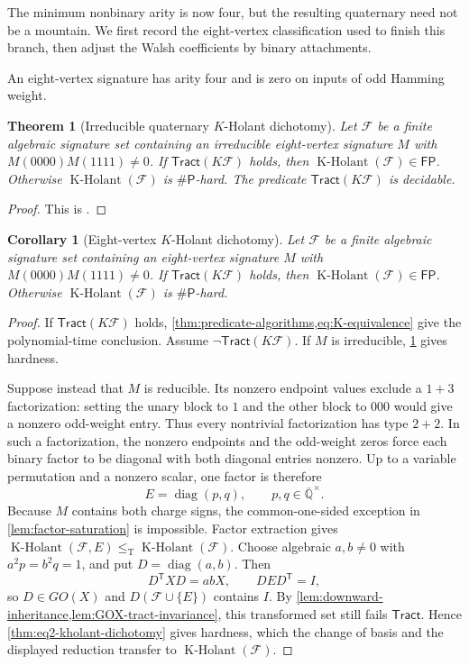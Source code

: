 \documentclass[11pt,letterpaper,onecolumn]{article}
\theoremstyle{plain}
\newtheorem{theorem}{Theorem}[section]
\newtheorem{corollary}[corollary]{Corollary}
\theoremstyle{definition}
\theoremstyle{remark}
\newcommand{\AlgNums}{\overline{\mathbb Q}}
\newcommand{\cF}{\mathcal F}
\newcommand{\KHolant}{\operatorname{K\text{-}Holant}}
\newcommand{\Tract}{\mathsf{Tract}}
\newcommand{\FP}{\mathsf{FP}}
\newcommand{\SharpP}{\#\mathsf P}
\newcommand{\diag}{\operatorname{diag}}
\newcommand{\leT}{\leq_{\mathrm T}}
\begin{document}
    The minimum nonbinary arity is now four, but the resulting quaternary
    need not be a mountain. We first record the eight-vertex classification
    used to finish this branch, then adjust the Walsh coefficients by binary
    attachments.
	
	An eight-vertex signature has arity four and is zero on inputs of odd Hamming weight.
	
	\begin{theorem}[Irreducible quaternary \(K\)-Holant dichotomy]
		\label{thm:quaternary-kholant-dichotomy}
		Let \(\cF\) be a finite algebraic signature set containing an
		irreducible eight-vertex signature \(M\) with \(M(0000)M(1111)\ne0\).
		If \(\Tract(K\cF)\) holds, then \(\KHolant(\cF)\in\FP\). Otherwise
		\(\KHolant(\cF)\) is \(\SharpP\)-hard.  The predicate \(\Tract(K\cF)\) is decidable.
	\end{theorem}
	
	\begin{proof}
		This is \cite[Theorem~1.3]{Liu2026DEQ2Holant}.
	\end{proof}
	
	\begin{corollary}[Eight-vertex \(K\)-Holant dichotomy]
		\label{cor:eight-vertex-complete-closure}
		Let \(\cF\) be a finite algebraic signature set containing an
		eight-vertex signature \(M\) with \(M(0000)M(1111)\ne0\).
		If \(\Tract(K\cF)\) holds, then \(\KHolant(\cF)\in\FP\). Otherwise
		\(\KHolant(\cF)\) is \(\SharpP\)-hard.
	\end{corollary}
	
	\begin{proof}
		If \(\Tract(K\cF)\) holds,
		\cref{thm:predicate-algorithms,eq:K-equivalence} give the polynomial-time
		conclusion.  Assume \(\neg\Tract(K\cF)\).  If \(M\) is irreducible,
		\cref{thm:quaternary-kholant-dichotomy} gives hardness.
		
		Suppose instead that \(M\) is reducible.  Its nonzero endpoint values
		exclude a \(1+3\) factorization: setting the unary block to \(1\) and the
		other block to \(000\) would give a nonzero odd-weight entry.  Thus every
		nontrivial factorization has type \(2+2\).  In such a factorization, the
		nonzero endpoints and the odd-weight zeros force each binary factor to be
		diagonal with both diagonal entries nonzero.  Up to a variable permutation and a
		nonzero scalar, one factor is therefore
		\[
		E=\diag(p,q),\qquad p,q\in\AlgNums^\times.
		\]
		Because \(M\) contains both charge signs, the common-one-sided exception in
		\cref{lem:factor-saturation} is impossible.  Factor extraction gives
		\(\KHolant(\cF,E)\leT\KHolant(\cF)\).
		Choose algebraic \(a,b\ne0\) with \(a^2p=b^2q=1\), and put
		\(D=\diag(a,b)\).  Then
		\[
		D^{\mathsf T}XD=abX,
		\qquad DED^{\mathsf T}=I,
		\]
		so \(D\in GO(X)\) and \(D(\cF\cup\{E\})\) contains \(I\).
		By \cref{lem:downward-inheritance,lem:GOX-tract-invariance}, this transformed
		set still fails \(\Tract\).  Hence \cref{thm:eq2-kholant-dichotomy}
		gives hardness, which the change of basis and the displayed reduction
        transfer to \(\KHolant(\cF)\).
	\end{proof}
	
\end{document}
